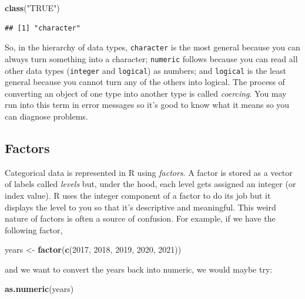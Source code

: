 \documentclass[
]{book}
\newenvironment{Shaded}{\begin{snugshade}}{\end{snugshade}}
\newcommand{\DecValTok}[1]{\textcolor[rgb]{0.00,0.00,0.81}{#1}}
\newcommand{\FunctionTok}[1]{\textcolor[rgb]{0.13,0.29,0.53}{\textbf{#1}}}
\newcommand{\NormalTok}[1]{#1}
\newcommand{\OtherTok}[1]{\textcolor[rgb]{0.56,0.35,0.01}{#1}}
\newcommand{\StringTok}[1]{\textcolor[rgb]{0.31,0.60,0.02}{#1}}
\begin{document}
\begin{Shaded}
\begin{Highlighting}[]
\FunctionTok{class}\NormalTok{(}\StringTok{"TRUE"}\NormalTok{)}
\end{Highlighting}
\end{Shaded}

\begin{verbatim}
## [1] "character"
\end{verbatim}

So, in the hierarchy of data types, \texttt{character} is the most general because you
can always turn something into a character; \texttt{numeric} follows because you can
read all other data types (\texttt{integer} and \texttt{logical}) as numbers; and \texttt{logical} is
the least general because you cannot turn any of the others into logical. The
process of converting an object of one type into another type is called
\emph{coercing}. You may run into this term in error messages so it's good to know
what it means so you can diagnose problems.

\hypertarget{factors}{%
\subsection{Factors}\label{factors}}

Categorical data is represented in R using \emph{factors}. A factor is stored as a
vector of labels called \emph{levels} but, under the hood, each level gets assigned
an integer (or index value). R uses the integer component of a factor to do its
job but it displays the level to you so that it's descriptive and meaningful.
This weird nature of factors is often a source of confusion. For example, if we
have the following factor,

\begin{Shaded}
\begin{Highlighting}[]
\NormalTok{years }\OtherTok{\textless{}{-}} \FunctionTok{factor}\NormalTok{(}\FunctionTok{c}\NormalTok{(}\DecValTok{2017}\NormalTok{, }\DecValTok{2018}\NormalTok{, }\DecValTok{2019}\NormalTok{, }\DecValTok{2020}\NormalTok{, }\DecValTok{2021}\NormalTok{))}
\end{Highlighting}
\end{Shaded}

and we want to convert the years back into numeric, we would maybe try:

\begin{Shaded}
\begin{Highlighting}[]
\FunctionTok{as.numeric}\NormalTok{(years)}
\end{Highlighting}
\end{Shaded}
\end{document}
